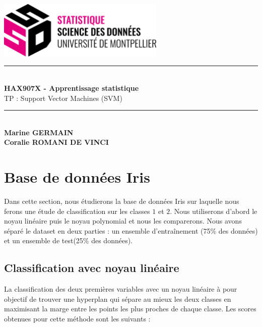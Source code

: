 \documentclass[a4paper,12pt]{article}
\begin{document}
\begin{titlepage}

    \vspace*{4cm}

    \centering
    
    \includegraphics[width=0.6\textwidth]{Images/logo.png} \\[1.5cm]
    
    \rule{\linewidth}{1pt} \\[1cm]

    {\Huge \bfseries HAX907X - Apprentissage statistique}\\[0.5cm]
    {\Huge TP : Support Vector Machines (SVM)}\\[1cm]
    
    \rule{\linewidth}{1pt} \\[2cm]

    {\Large \textbf{Marine GERMAIN}}\\
    {\Large \textbf{Coralie ROMANI DE VINCI}}\\[1cm]
    

\end{titlepage}


\renewcommand{\contentsname}{Table des matières}
\tableofcontents


\newpage

\section{Base de données Iris}

Dans cette section, nous étudierons la base de données Iris sur laquelle nous ferons une étude de classification sur les classes $1$ et $2$.
Nous utiliserons d'abord le noyau linéaire puis le noyau polynomial et nous les comparerons.
Nous avons séparé le dataset en deux parties : un ensemble d'entraînement (75\% des données) et un ensemble de test(25\% des données). 

\subsection{Classification avec noyau linéaire}

La classification des deux premières variables avec un noyau linéaire à pour objectif de trouver une hyperplan qui sépare au mieux les deux classes en maximisant la marge entre les points les plus proches de chaque classe. 
Les scores obtenues pour cette méthode sont les suivants :
\end{document}

